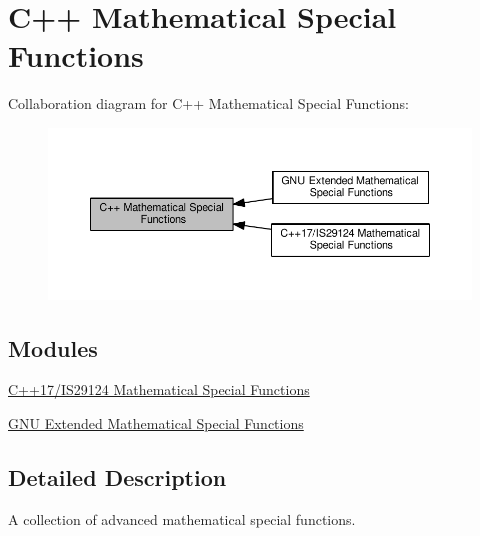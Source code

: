\hypertarget{group__math__spec__func}{}\section{C++ Mathematical Special Functions}
\label{group__math__spec__func}
Collaboration diagram for C++ Mathematical Special Functions\+:
\nopagebreak
\begin{figure}[H]
\begin{center}
\leavevmode
\includegraphics[width=350pt]{group__math__spec__func}
\end{center}
\end{figure}
\subsection*{Modules}
\begin{DoxyCompactItemize}
\item 
\hyperlink{group__tr29124__math__spec__func}{C++17/\+I\+S29124 Mathematical Special Functions}
\item 
\hyperlink{group__gnu__math__spec__func}{G\+N\+U Extended Mathematical Special Functions}
\end{DoxyCompactItemize}


\subsection{Detailed Description}
A collection of advanced mathematical special functions. 